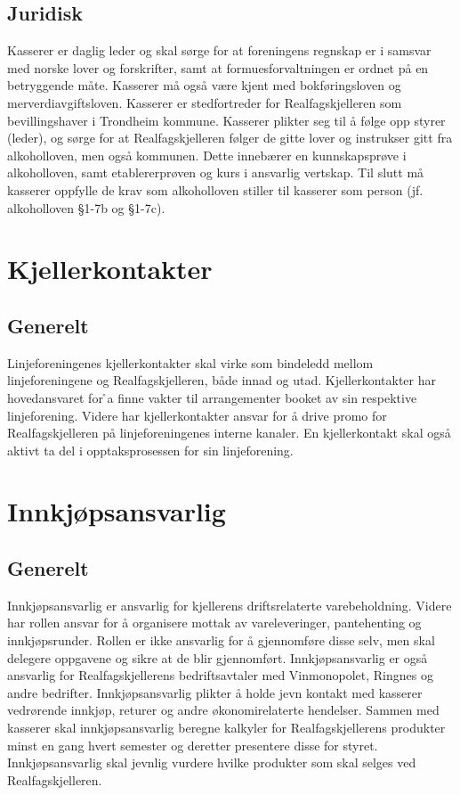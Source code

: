 \documentclass{article}
\begin{document}
\subsection{Juridisk}
Kasserer er daglig leder og skal sørge for at foreningens regnskap er i samsvar med norske lover og forskrifter, samt at formuesforvaltningen er ordnet på en betryggende måte. Kasserer må også være kjent med bokføringsloven og merverdiavgiftsloven.\newline
Kasserer er stedfortreder for Realfagskjelleren som bevillingshaver i Trondheim kommune. Kasserer plikter seg til å følge opp styrer (leder), og sørge for at Realfagskjelleren følger de gitte lover og instrukser gitt fra alkoholloven, men også kommunen. Dette innebærer en kunnskapsprøve i alkoholloven, samt etablererprøven og kurs i ansvarlig vertskap. Til slutt må kasserer oppfylle de krav som alkoholloven stiller til kasserer som person (jf. alkoholloven \S 1-7b og \S 1-7c).

\section{Kjellerkontakter}
\subsection{Generelt}
Linjeforeningenes kjellerkontakter skal virke som bindeledd mellom linjeforeningene og Realfagskjelleren, både innad og utad. \newline
Kjellerkontakter har hovedansvaret for ̊a finne vakter til arrangementer booket av sin respektive linjeforening. Videre har kjellerkontakter ansvar for å drive promo for Realfagskjelleren på linjeforeningenes interne kanaler. En kjellerkontakt skal også aktivt ta del i opptaksprosessen for sin linjeforening.

\section{Innkjøpsansvarlig}
\subsection{Generelt}
Innkjøpsansvarlig er ansvarlig for kjellerens driftsrelaterte varebeholdning. \newline
Videre har rollen ansvar for å organisere mottak av vareleveringer, pantehenting og innkjøpsrunder. Rollen er ikke ansvarlig for å gjennomføre disse selv, men skal delegere oppgavene og sikre at de blir gjennomført. \newline
Innkjøpsansvarlig er også ansvarlig for Realfagskjellerens bedriftsavtaler med Vinmonopolet, Ringnes og andre bedrifter. \newline
Innkjøpsansvarlig plikter å holde jevn kontakt med kasserer vedrørende innkjøp, returer og andre økonomirelaterte hendelser. Sammen med kasserer skal innkjøpsansvarlig beregne kalkyler for Realfagskjellerens produkter minst en gang hvert semester og deretter presentere disse for styret. Innkjøpsansvarlig skal jevnlig vurdere hvilke produkter som skal selges ved Realfagskjelleren. 
\end{document}
